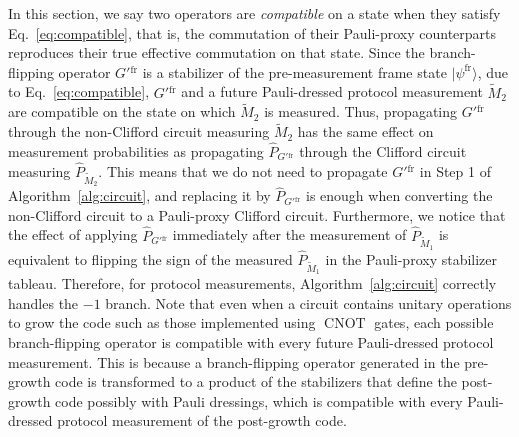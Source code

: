 \documentclass[
 reprint,
 amsmath,amssymb,
 pra,superscriptaddress, nofootinbib
]{revtex4-2}
\theoremstyle{definition}
\theoremstyle{plain}
\newcommand{\CNOT}{\operatorname{CNOT}}
\begin{document}
In this section, we say two operators are \emph{compatible} on a state when they satisfy Eq.~\eqref{eq:compatible}, that is, the commutation of their Pauli-proxy counterparts reproduces their true effective commutation on that state.
Since the branch-flipping operator $G'{^\mathrm{fr}}$ is a stabilizer of the pre-measurement frame state $|\psi^\mathrm{fr} \rangle$, due to Eq.~\eqref{eq:compatible}, $G'{^\mathrm{fr}}$ and a future Pauli-dressed protocol measurement $\tilde{M}_2$ are compatible on the state on which $\tilde{M}_2$ is measured.
Thus, propagating $G'{^\mathrm{fr}}$ through the non-Clifford circuit measuring $\tilde{M}_2$ has the same effect on measurement probabilities as propagating $\hat{P}_{G'{^\mathrm{fr}}}$ through the Clifford circuit measuring $\hat{P}_{\tilde{M}_2}$. 
This means that we do not need to propagate $G'{^\mathrm{fr}}$ in Step 1 of Algorithm~\ref{alg:circuit}, and replacing it by $\hat{P}_{G'{^\mathrm{fr}}}$ is enough when converting the non-Clifford circuit to a Pauli-proxy Clifford circuit. 
Furthermore, we notice that the effect of applying $\hat{P}_{G'{^\mathrm{fr}}}$ immediately after the measurement of $\hat{P}_{\tilde{M}_1}$ is equivalent to flipping the sign of the measured $\hat{P}_{\tilde{M}_1}$ in the Pauli-proxy stabilizer tableau. 
Therefore, for protocol measurements, Algorithm~\ref{alg:circuit} correctly handles the $-1$ branch.
Note that even when a circuit contains unitary operations to grow the code such as those implemented using $\CNOT$ gates, each possible branch-flipping operator is compatible with every future Pauli-dressed protocol measurement. This is because a branch-flipping operator generated in the pre-growth code is transformed to a product of the stabilizers that define the post-growth code possibly with Pauli dressings, which is compatible with every Pauli-dressed protocol measurement of the post-growth code.
\end{document}
